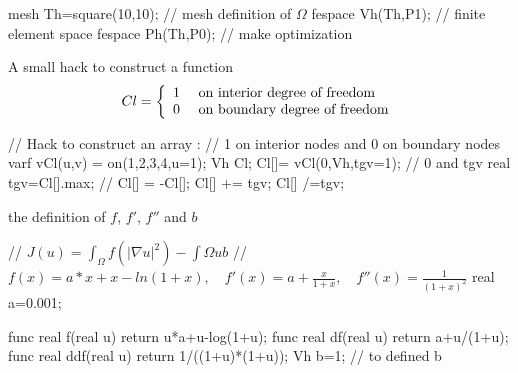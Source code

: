 \documentclass[twoside]{book}
\newif\ifpdf
\begin{document}
\graphicspath{{./}{plots/}}
\ifpdf
\DeclareGraphicsExtensions{.pdf, .jpg, .tif}
\else
{}
\fi

\let\subsubsection\subsection
\let\subsection\section
\let\section\chapter


\bFF

mesh Th=square(10,10);  // mesh definition of $\Omega$
fespace Vh(Th,P1);      // finite element space
fespace Ph(Th,P0);      // make optimization

\eFF

A small hack to construct a function 
$$Cl= \left\{\begin{array}{cl} 1 & \mbox{ on interior degree of freedom} \cr
 0 & \mbox{ on boundary degree of freedom} \end{array}\right. $$
\bFF

// Hack to construct an array :
//  1 on interior nodes and 0 on boundary nodes
varf vCl(u,v) = on(1,2,3,4,u=1);
Vh Cl;
Cl[]= vCl(0,Vh,tgv=1);  //  0 and tgv 
real tgv=Cl[].max;     // 
Cl[] = -Cl[];  Cl[] += tgv; Cl[] /=tgv;

 
\eFF

the definition of $f$, $f'$, $f''$ and $b$
\bFF

// $ J(u) = \int_\Omega f(|\nabla u|^2) - \int\Omega  u b $
// $ f(x) = a*x + x-ln(1+x), \quad f'(x) = a+\frac{x}{1+x}, \quad f''(x) =  \frac{1}{(1+x)^2}$
real a=0.001;

func real f(real u) { return u*a+u-log(1+u); }
func real df(real u) { return a+u/(1+u);}
func real ddf(real u) { return 1/((1+u)*(1+u));}
Vh b=1;  // to defined b
\eFF
\end{document}
